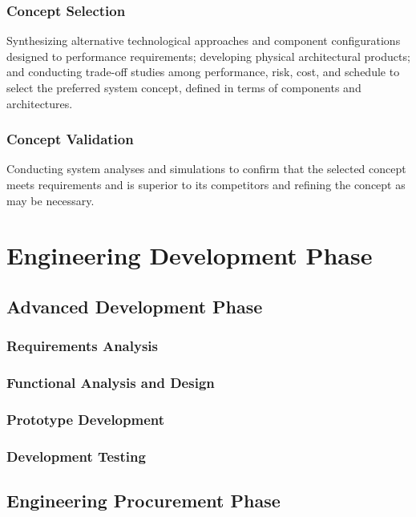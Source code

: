 \documentclass[a4paper,11pt,fleqn]{report}
\begin{document}
\subsection{Concept Selection}
Synthesizing alternative technological approaches and component configurations designed to performance requirements; developing physical architectural products; and conducting trade-off studies among performance, risk, cost, and schedule to select the preferred system concept, defined in terms of components and architectures. 

\subsection{Concept Validation}
Conducting system analyses and simulations to confirm that the selected concept meets requirements and is superior to its competitors and refining the concept as may be necessary. 

\chapter{Engineering Development Phase}

\section{Advanced Development Phase}

\subsection{Requirements Analysis}

\subsection{Functional Analysis and Design}

\subsection{Prototype Development}

\subsection{Development Testing}

\section{Engineering Procurement Phase}
\end{document}
